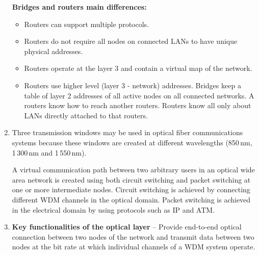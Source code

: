 \documentclass[a4paper, 11pt]{article}
\begin{document}
\begin{enumerate}

			\textbf{Bridges and routers main differences:}
			\begin{itemize}
				\item
					Routers can support multiple protocols.

				\item
					Routers do not require all nodes on connected LANs to have unique physical addresses.

				\item
					Routers operate at the layer 3 and contain a virtual map of the network.

				\item
					Routers use higher level (layer 3 - network) addresses. Bridges keep a table of layer 2 addresses
					of all active nodes on all connected networks. A routers know how to reach another routers.
					Routers know all only about LANs directly attached to that routers.
			\end{itemize}

		\item %
			Three transmission windows may be used in optical fiber communications systems because these windows are
			created at different wavelengths (850\,nm, 1\,300\,nm and 1\,550\,nm).

			A virtual communication path between two arbitrary users in an optical wide area network is created using
			both circuit switching and packet switching at one or more intermediate nodes. Circuit switching is
			achieved by connecting different WDM channels in the optical domain. Packet switching is achieved in the
			electrical domain by using protocols such as IP and ATM.

		\item %
			\textbf{Key functionalities of the optical layer} -- Provide end-to-end optical connection between two
			nodes of the network and transmit data between two nodes at the bit rate at which individual channels
			of a WDM system operate.


\end{enumerate}
\end{document}
